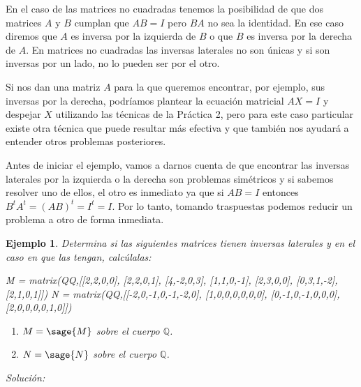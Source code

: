 \documentclass{amsart}
\newtheorem{ejem}{Ejemplo}
\begin{document}
En el caso de las matrices no cuadradas tenemos la posibilidad de que 
dos matrices $A$ y $B$ cumplan que $AB = I$ pero $BA$ no sea la identidad.
En ese caso diremos que $A$ es inversa por la izquierda de $B$ o que $B$ 
es inversa por la derecha de $A$. En matrices no cuadradas las inversas
laterales no son únicas y si son inversas por un lado, no lo pueden ser 
por el otro. 

Si nos dan una matriz $A$ para la que queremos encontrar, por ejemplo, 
sus inversas por la derecha, podríamos plantear la ecuación matricial 
$AX = I$ y despejar $X$ utilizando las técnicas de la Práctica 2, pero
para este caso particular existe otra técnica que puede resultar más
efectiva y que también nos ayudará a entender otros problemas posteriores.

Antes de iniciar el ejemplo, vamos a darnos cuenta de que encontrar las
inversas laterales por la izquierda o la derecha son problemas simétricos
y si sabemos resolver uno de ellos, el otro es inmediato ya que si $AB = I$
entonces $B^t A^t = (AB)^t = I^t = I$. Por lo tanto, tomando traspuestas
podemos reducir un problema a otro de forma inmediata.

\begin{ejem}
Determina si las siguientes matrices tienen inversas laterales y en 
el caso en que las tengan, calcúlalas:

\begin{sagecode}
M = matrix(QQ,[[2,2,0,0],
[2,2,0,1],
[4,-2,0,3],
[1,1,0,-1],
[2,3,0,0],
[0,3,1,-2],
[2,1,0,1]])
N = matrix(QQ,[[-2,0,-1,0,-1,-2,0],
[1,0,0,0,0,0,0],
[0,-1,0,-1,0,0,0],
[2,0,0,0,0,1,0]])
\end{sagecode}

\begin{enumerate}
\item $M = \sage{M}$ sobre el cuerpo ${\mathbb Q}$.
\item $N = \sage{N}$ sobre el cuerpo ${\mathbb Q}$.
\end{enumerate}
\end{ejem}

{\it Solución:}
\end{document}
